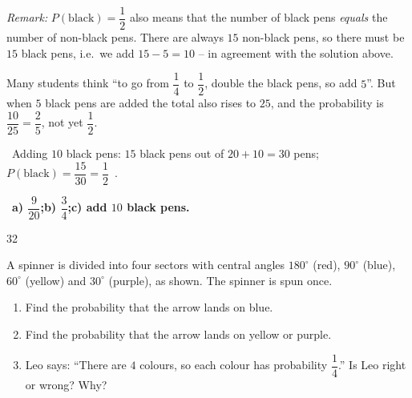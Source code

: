 \documentclass[11pt]{article}
\providecommand{\AnsWord}{Đáp số}
\newenvironment{probbox}[2]{\begin{probboxT}{#1}{#2}}{\end{probboxT}}
\newcommand{\ans}[1]{\par\smallskip{\bfseries\color{tmGreen!88!black}\AnsWord:}\ {\bfseries\color{AnsRed}#1}\par}
\newcommand{\verify}[1]{\par\smallskip\noindent{\bfseries\color{tmGreen!80!black}\faCheckCircle\ \CheckWord}\ #1\par}
\def\AnsWord{Answer}
\def\CheckWord{Check:}
\begin{document}
{\emph{Remark:} $P(\text{black})=\dfrac12$ also means that the number of black pens \emph{equals} the number of non-black pens. There are always $15$ non-black pens, so there must be $15$ black pens, i.e.\ we add $15-5=10$ -- in agreement with the solution above.
\begin{warnbox}Many students think ``to go from $\dfrac14$ to $\dfrac12$, double the black pens, so add $5$''. But when $5$ black pens are added the total also rises to $25$, and the probability is $\dfrac{10}{25}=\dfrac25$, not yet $\dfrac12$.\end{warnbox}
\verify{Adding $10$ black pens: $15$ black pens out of $20+10=30$ pens; $P(\text{black})=\dfrac{15}{30}=\dfrac12$~\checkmark.}
\ans{a) $\dfrac{9}{20}$;\quad b) $\dfrac34$;\quad c) add $10$ black pens.}
}

\begin{probbox}{32}{\relax}
\begin{minipage}[t]{0.6\linewidth}\vspace{0pt}
A spinner is divided into four sectors with central angles $180^\circ$ (red), $90^\circ$ (blue), $60^\circ$ (yellow) and $30^\circ$ (purple), as shown. The spinner is spun once.
\begin{enumerate}[label=\alph*),leftmargin=1.5em,itemsep=0pt,topsep=2pt]
\item Find the probability that the arrow lands on blue.
\item Find the probability that the arrow lands on yellow or purple.
\item Leo says: ``There are $4$ colours, so each colour has probability $\dfrac14$.'' Is Leo right or wrong? Why?
\end{enumerate}
\end{minipage}\hfill
\begin{minipage}[t]{0.36\linewidth}\vspace{0pt}
\centering{}
\end{minipage}
\end{probbox}
\end{document}
